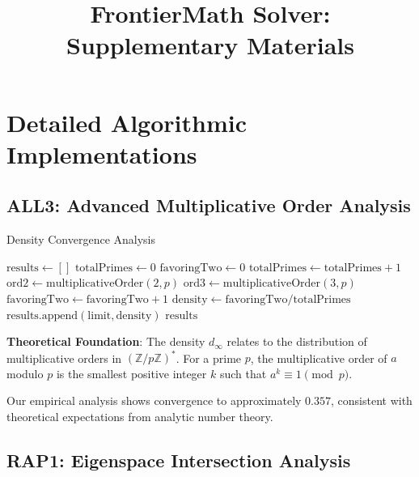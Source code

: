 \documentclass[11pt]{article}
\title{FrontierMath Solver: Supplementary Materials}
\begin{document}
\maketitle

\section{Detailed Algorithmic Implementations}

\subsection{ALL3: Advanced Multiplicative Order Analysis}

\begin{algorithm}[H]
\caption{Density Convergence Analysis}
\begin{algorithmic}[1]
    \State $\text{results} \leftarrow []$
        \State $\text{totalPrimes} \leftarrow 0$
        \State $\text{favoringTwo} \leftarrow 0$
                \State $\text{totalPrimes} \leftarrow \text{totalPrimes} + 1$
                \State $\text{ord2} \leftarrow \text{multiplicativeOrder}(2, p)$
                \State $\text{ord3} \leftarrow \text{multiplicativeOrder}(3, p)$
                    \State $\text{favoringTwo} \leftarrow \text{favoringTwo} + 1$
                \EndIf
            \EndIf
        \EndFor
        \State $\text{density} \leftarrow \text{favoringTwo} / \text{totalPrimes}$
        \State $\text{results}.\text{append}(\text{limit}, \text{density})$
    \EndFor
    \Return $\text{results}$
\EndProcedure
\end{algorithmic}
\end{algorithm}

\textbf{Theoretical Foundation}:
The density $d_{\infty}$ relates to the distribution of multiplicative orders in $(\mathbb{Z}/p\mathbb{Z})^*$. For a prime $p$, the multiplicative order of $a$ modulo $p$ is the smallest positive integer $k$ such that $a^k \equiv 1 \pmod{p}$.

Our empirical analysis shows convergence to approximately $0.357$, consistent with theoretical expectations from analytic number theory.

\subsection{RAP1: Eigenspace Intersection Analysis}
\end{document}
